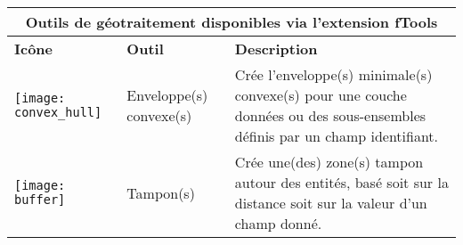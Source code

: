 \begin{table}[ht]
\centering
 \begin{tabular}{|m{1cm}|m{3cm}|m{12cm}|}
 \hline \multicolumn{3}{|c|}{\textbf{Outils de géotraitement disponibles via l'extension fTools}} \\
 \hline \textbf{Icône} & \textbf{Outil} & \textbf{Description} \\
 \hline \texttt{[image: convex\_hull]} & Enveloppe(s) convexe(s) & Crée l'enveloppe(s) minimale(s) convexe(s) pour une couche données ou des sous-ensembles définis par un champ identifiant. \\
 \hline \texttt{[image: buffer]} & Tampon(s) & Crée une(des) zone(s) tampon autour des entités, basé soit sur la distance soit sur la valeur d'un champ donné. \\

\end{tabular}
\end{table}
